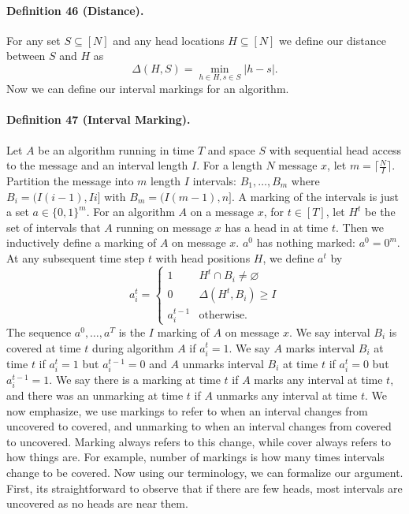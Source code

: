 \documentclass[10pt,a4paper]{article}
\begin{document}
\paragraph{Definition 46 (Distance).} For any set $S\subseteq[N]$ and any head locations $H\subseteq[N]$ we define our distance between $S$ and $H$ as
\[\Delta(H,S)=\min_{h\in H,s\in S}|h-s|.\]
Now we can define our interval markings for an algorithm.
\paragraph{Definition 47 (Interval Marking).} Let $A$ be an algorithm running in time $T$ and space $S$ with sequential head access to the message and an interval length $I$.
For a length $N$ message $x$, let $m=\lceil\frac NI\rceil$. Partition the message into $m$ length $I$ intervals: $B_1,\ldots,B_m$ where $B_i=(I(i-1),Ii]$ with $B_m=(I(m-1),n]$. A marking of the intervals is just a set $a\in\{0,1\}^m$.
For an algorithm $A$ on a message $x$, for $t\in[T]$, let $H^t$ be the set of intervals that $A$ running on message $x$ has a head in at time $t$.
Then we inductively define a marking of $A$ on message $x$. $a^0$ has nothing marked: $a^0=0^m$. At any subsequent time step $t$ with head positions $H$, we define $a^t$ by
\[a_i^t=\begin{cases}1&H^t\cap B_i\ne\varnothing\\0&\Delta(H^t,B_i)\ge I\\a_i^{t-1}&\text{otherwise.}\end{cases}\]
The sequence $a^0,\ldots,a^T$ is the $I$ marking of $A$ on message $x$.
We say interval $B_i$ is covered at time $t$ during algorithm $A$ if $a_i^t=1$. We say $A$ marks interval $B_i$ at time $t$ if $a_i^t=1$ but $a_i^{t-1}=0$ and $A$ unmarks interval $B_i$ at time $t$ if $a_i^t=0$ but $a_i^{t-1}=1$. We say there is a marking at time $t$ if $A$ marks any interval at time $t$, and there was an unmarking at time $t$ if $A$ unmarks any interval at time $t$.
We now emphasize, we use markings to refer to when an interval changes from uncovered to covered, and unmarking to when an interval changes from covered to uncovered. Marking always refers to this change, while cover always refers to how things are. For example, number of markings is how many times intervals change to be covered.
Now using our terminology, we can formalize our argument. First, its straightforward to observe that if there are few heads, most intervals are uncovered as no heads are near them.
\end{document}
